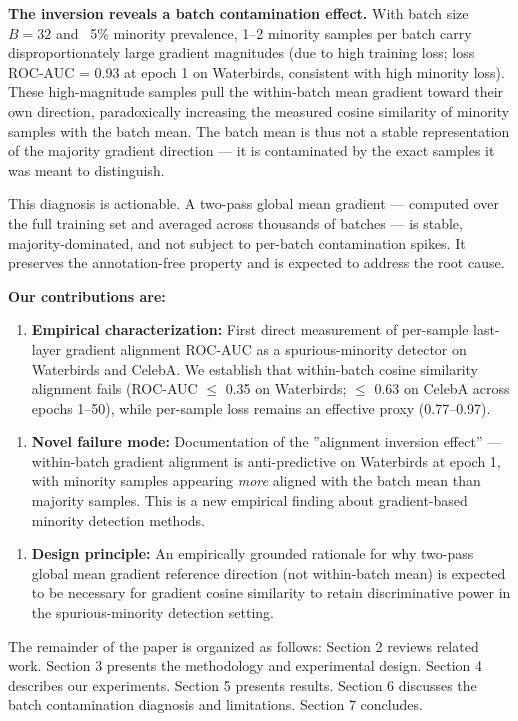\textbf{The inversion reveals a batch contamination effect.} With batch size $B = 32$ and ~5\% minority prevalence, 1--2 minority samples per batch carry disproportionately large gradient magnitudes (due to high training loss; loss ROC-AUC = 0.93 at epoch 1 on Waterbirds, consistent with high minority loss). These high-magnitude samples pull the within-batch mean gradient toward their own direction, paradoxically increasing the measured cosine similarity of minority samples with the batch mean. The batch mean is thus not a stable representation of the majority gradient direction --- it is contaminated by the exact samples it was meant to distinguish.

This diagnosis is actionable. A two-pass global mean gradient --- computed over the full training set and averaged across thousands of batches --- is stable, majority-dominated, and not subject to per-batch contamination spikes. It preserves the annotation-free property and is expected to address the root cause.

\textbf{Our contributions are:}

\begin{enumerate}
\item \textbf{Empirical characterization:} First direct measurement of per-sample last-layer gradient alignment ROC-AUC as a spurious-minority detector on Waterbirds and CelebA. We establish that within-batch cosine similarity alignment fails (ROC-AUC $\leq$ 0.35 on Waterbirds; $\leq$ 0.63 on CelebA across epochs 1--50), while per-sample loss remains an effective proxy (0.77--0.97).
\end{enumerate}

\begin{enumerate}
\item \textbf{Novel failure mode:} Documentation of the ''alignment inversion effect'' --- within-batch gradient alignment is anti-predictive on Waterbirds at epoch 1, with minority samples appearing \textit{more} aligned with the batch mean than majority samples. This is a new empirical finding about gradient-based minority detection methods.
\end{enumerate}

\begin{enumerate}
\item \textbf{Design principle:} An empirically grounded rationale for why two-pass global mean gradient reference direction (not within-batch mean) is expected to be necessary for gradient cosine similarity to retain discriminative power in the spurious-minority detection setting.
\end{enumerate}

The remainder of the paper is organized as follows: Section 2 reviews related work. Section 3 presents the methodology and experimental design. Section 4 describes our experiments. Section 5 presents results. Section 6 discusses the batch contamination diagnosis and limitations. Section 7 concludes.

